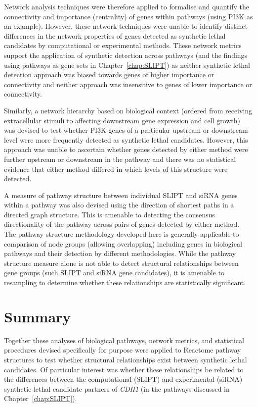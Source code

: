 Network analysis techniques were therefore applied to formalise and quantify the connectivity and importance (centrality) of genes within pathways (using PI3K as an example). However, these network techniques were unable to identify distinct differences in the network properties of genes detected as synthetic lethal candidates by computational or experimental methods. These network metrics support the application of synthetic detection across pathways (and the findings using pathways as gene sets in Chapter~\ref{chap:SLIPT}) as neither synthetic lethal detection approach was biased towards genes of higher importance or connectivity and neither approach was insensitive to genes of lower  importance or connectivity.

Similarly, a network hierarchy based on biological context (ordered from receiving extracellular stimuli to affecting downstream gene expression and cell growth) was devised to test whether PI3K genes of a particular upstream or downstream level were more frequently detected as synthetic lethal candidates. However, this approach was unable to ascertain whether genes detected by either method were further upstream or downstream in the pathway and there was no statistical evidence that either method differed in which levels of this structure were detected.

A measure of pathway structure between individual \gls{SLIPT} and \gls{siRNA} genes within a pathway was also devised using the direction of shortest paths in a directed graph structure. This is amenable to detecting the consensus directionality of the pathway across pairs of genes detected by either method. The pathway structure methodology developed here is generally applicable to comparison of node groups (allowing overlapping) including genes in biological pathways and their detection by different methodologies. While the pathway structure measure alone is not able to detect structural relationships between gene groups (such \gls{SLIPT} and \gls{siRNA} gene candidates), it is amenable to resampling to determine whether these relationships are statistically significant.

\section{Summary}

Together these analyses of biological pathways, network metrics, and statistical procedures devised specifically for purpose were applied to Reactome pathway structures to test whether structural relationships exist between synthetic lethal candidates. Of particular interest was whether these relationships be related to the differences between the computational (\gls{SLIPT}) and experimental (\gls{siRNA}) synthetic lethal candidate partners of \textit{CDH1} (in the pathways discussed in Chapter~\ref{chap:SLIPT}).

